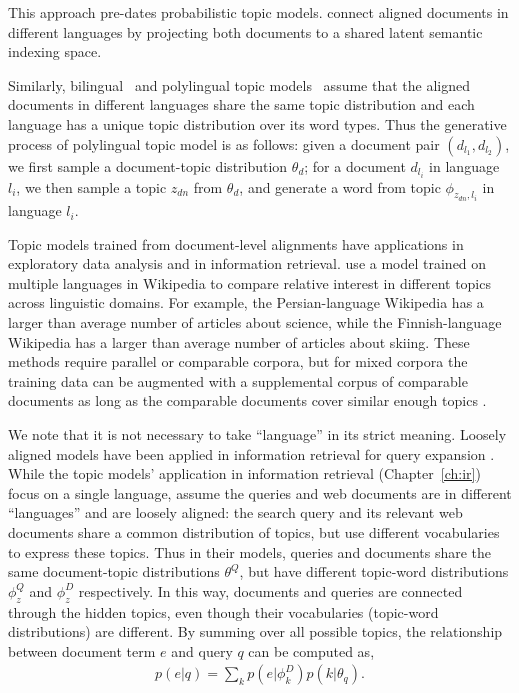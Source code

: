 This approach pre-dates probabilistic topic models.
\citet{Landauer-1990} connect aligned documents in different languages
by projecting both documents to a shared latent semantic indexing
space.

Similarly, bilingual~\citep{zhao-06} and polylingual topic models~\citep[\plda{}]{mimno-09}
assume that the aligned documents in different languages share the
same topic distribution and each language has a unique topic
distribution over its word types.
Thus the generative process of polylingual topic model is as follows:
given a document pair $(d_{l_1}, d_{l_2})$, we first sample a
document-topic distribution $\theta_d$; for a document $d_{l_i}$ in
language $l_i$, we then sample a topic $z_{dn}$ from $\theta_d$, and
generate a word from topic $\phi_{z_{dn}, l_i}$ in language $l_i$.

Topic models trained from document-level alignments have applications in exploratory data analysis and in information retrieval.
\citet{mimno-09} use a model trained on multiple languages in Wikipedia to compare relative interest in different topics across linguistic domains.
For example, the Persian-language Wikipedia has a larger than average number of articles about science, while the Finnish-language Wikipedia has a larger than average number of articles about skiing.
These methods require parallel or comparable corpora, but for mixed corpora the training data can be augmented with a supplemental corpus of comparable documents as long as  the comparable documents cover similar enough topics \citep{mimno-12b}.
 

We note that it is not necessary to take ``language'' in its strict meaning.
Loosely aligned models have been applied in information retrieval for query expansion \citep{Gao-2011,Gao-2012}. 
While the topic models' application in information retrieval (Chapter~\ref{ch:ir}) focus
on a single language, \cite{Gao-2011} assume the queries and web documents are in
different ``languages'' and are loosely aligned: the search query and its relevant web documents share a common distribution of
topics, but use different vocabularies to express these topics. Thus
in their models, queries and documents share the same document-topic
distributions $\theta^Q$, but have different topic-word distributions
$\phi_z^Q$ and $\phi_z^D$ respectively.
In this way, documents and queries are
connected through the hidden topics, even though their vocabularies
(topic-word distributions) are different. By summing over all possible
topics, the relationship between document term $e$ and query $q$ can
be computed as,
\begin{align}
p(e|q) = \sum_k p(e|\phi_k^D) p(k | \theta_q).
\end{align}

